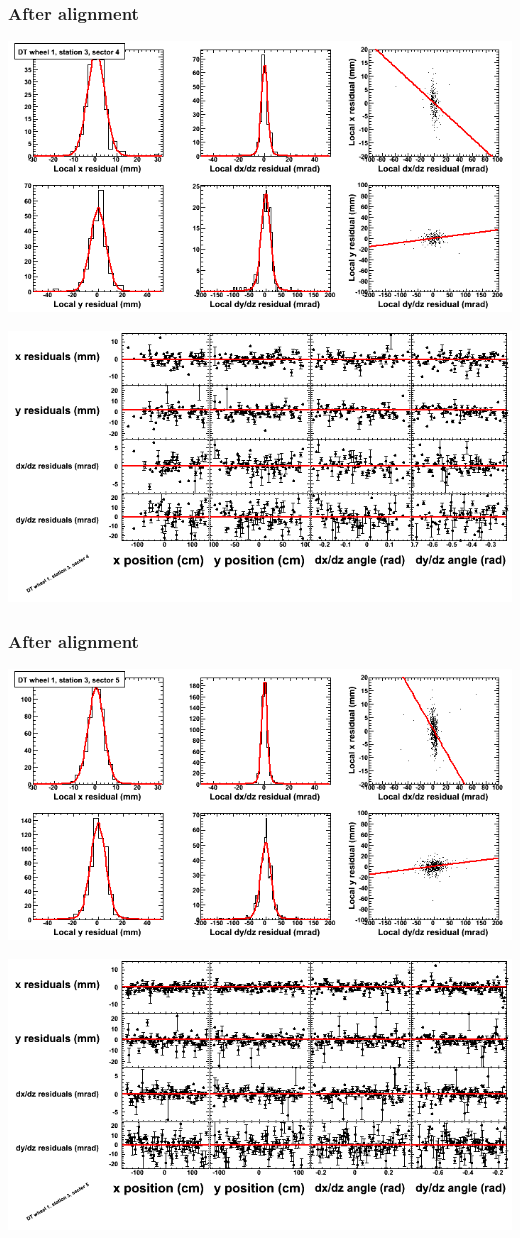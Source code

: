 \documentclass[compress]{beamer}
\begin{document}
\begin{frame}
\frametitle{After alignment}
\includegraphics[width=0.7\linewidth]{NOV4_fitfunctions/MBwhDst3sec04_bellcurves.png}

\includegraphics[width=0.7\linewidth]{NOV4_fitfunctions/MBwhDst3sec04_polynomials.png}
\end{frame}

\begin{frame}
\frametitle{After alignment}
\includegraphics[width=0.7\linewidth]{NOV4_fitfunctions/MBwhDst3sec05_bellcurves.png}

\includegraphics[width=0.7\linewidth]{NOV4_fitfunctions/MBwhDst3sec05_polynomials.png}
\end{frame}
\end{document}
